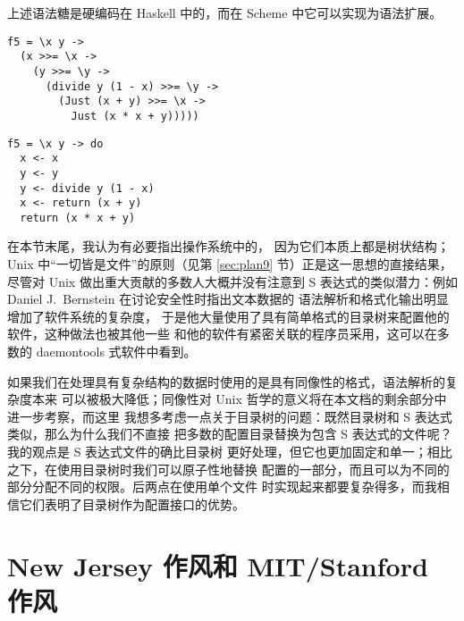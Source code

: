 上述语法糖是硬编码在 Haskell 中的，而在 Scheme 中它可以实现为语法扩展。
\pagebreak
\colskipa\begin{multicols}{2}
\begin{quoting}
\begin{Verbatim}
f5 = \x y ->
  (x >>= \x ->
    (y >>= \y ->
      (divide y (1 - x) >>= \y ->
        (Just (x + y) >>= \x ->
          Just (x * x + y)))))
\end{Verbatim}
\end{quoting}
\begin{quoting}
\begin{Verbatim}
f5 = \x y -> do
  x <- x
  y <- y
  y <- divide y (1 - x)
  x <- return (x + y)
  return (x * x + y)
\end{Verbatim}
\end{quoting}
\end{multicols}\colskipb

在本节末尾，我认为有必要指出操作系统中的，
因为它们本质上都是树状结构；Unix 中“一切皆是文件”的原则（见第 \ref{sec:plan9}
节）正是这一思想的直接结果，尽管对 Unix 做出重大贡献的多数人大概并没有注意到
S 表达式的类似潜力：例如 Daniel J.\ Bernstein 在讨论安全性时指出文本数据的
语法解析和格式化输出明显增加了软件系统的复杂度，
于是他大量使用了具有简单格式的目录树来配置他的软件，这种做法也被其他一些
和他的软件有紧密关联的程序员采用，这可以在多数的 daemontools 式软件中看到。

如果我们在处理具有复杂结构的数据时使用的是具有同像性的格式，语法解析的复杂度本来
可以被极大降低；同像性对 Unix 哲学的意义将在本文档的剩余部分中进一步考察，而这里
我想多考虑一点关于目录树的问题：既然目录树和 S 表达式类似，那么为什么我们不直接
把多数的配置目录替换为包含 S 表达式的文件呢？我的观点是 S 表达式文件的确比目录树
更好处理，但它也更加固定和单一；相比之下，在使用目录树时我们可以原子性地替换
配置的一部分，而且可以为不同的部分分配不同的权限。后两点在使用单个文件
时实现起来都要复杂得多，而我相信它们表明了目录树作为配置接口的优势。

\section{New Jersey 作风和 MIT/Stanford 作风}\label{sec:wib}

